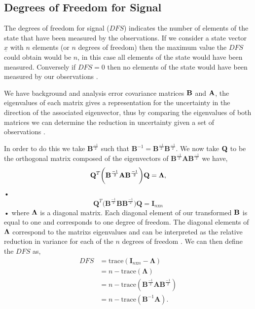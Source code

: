 \documentclass[11pt]{article}
\begin{document}
\subsection{Degrees of Freedom for Signal}

The degrees of freedom for signal ($DFS$) indicates the number of elements of the state that have been measured by the observations. If we consider a state vector $\underline{x}$ with $n$ elements (or $n$ degrees of freedom) then the maximum value the $DFS$ could obtain would be $n$, in this case all elements of the state would have been measured. Conversely if $DFS = 0$ then no elements of the state would have been measured by our observations \cite{fowler2011measures}.

We have background and analysis error covariance matrices $\bf{B}$ and $\bf{A}$, the eigenvalues of each matrix gives a representation for the uncertainty in the direction of the associated eigenvector, thus by comparing the eigenvalues of both matrices we can determine the reduction in uncertainty given a set of observations \cite{stewart2008correlated}.

In order to do this we take $\mathbf{B}^{\frac{-1}{2}}$ such that $\mathbf{B}^{-1} = \mathbf{B}^{\frac{-1}{2}}\mathbf{B}^{\frac{-1}{2}}$. We now take $\bf{Q}$ to be the orthogonal matrix composed of the eigenvectors of $\mathbf{B}^{\frac{-1}{2}}\mathbf{A}\mathbf{B}^{\frac{-1}{2}}$ we have,
\begin{equation}
\mathbf{Q}^{T}\bigg(\mathbf{B}^{\frac{-1}{2}}\mathbf{A}\mathbf{B}^{\frac{-1}{2}}\bigg)\mathbf{Q} = \bf{\Lambda},
\end{equation}• 
\begin{equation}
\mathbf{Q}^{T}\bigg(\mathbf{B}^{\frac{-1}{2}}\mathbf{B}\mathbf{B}^{\frac{-1}{2}}\bigg)\mathbf{Q} = \mathbf{I}_{n\text{x}n}
\end{equation}•
where $\bf{\Lambda}$ is a diagonal matrix. Each diagonal element of our transformed $\bf{B}$ is equal to one and corresponds to one degree of freedom. The diagonal elements of $\bf{\Lambda}$ correspond to the matrixs eigenvalues and can be interpreted as the relative reduction in variance for each of the $n$ degrees of freedom \cite{sandu2012practical}. We can then define the $DFS$ as,
\begin{equation}
\begin{split}
DFS & = \text{trace}(\mathbf{I}_{n\text{x}n} - \mathbf{\Lambda}) \\
       & = n - \text{trace}(\mathbf{\Lambda}) \\
       & = n - \text{trace}(\mathbf{B}^{\frac{-1}{2}}\mathbf{A}\mathbf{B}^{\frac{-1}{2}}) \\
       & = n - \text{trace}(\mathbf{B}^{-1}\mathbf{A}).
\end{split}
\end{equation}
\end{document}
